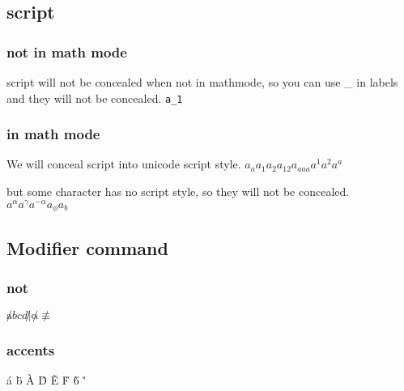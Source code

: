 \documentclass{ctexbook}
\begin{document}
\subsection{script}
\subsubsection{not in math mode}
script will not be concealed when not in mathmode, so you can use \_ in labels and they will not be concealed.
\verb|a_1|
\subsubsection{in math mode}
We will conceal script into unicode script style.
\(a_a a_1 a_2 a_{12} a_{aaa} a^1 a^2 a^a \)

but some character has no script style, so they will not be concealed.
\(a^\alpha a^\gamma a^{-\alpha} a_\phi a_b\)
\subsection{Modifier command}
\subsubsection{not}
\( \not abcd \not | \not \alpha \not\equiv \)
\subsubsection{accents}
\'a \"b \`A \^D \~E \.F \`6 \'\alpha \.\beta \not \pi
\end{document}
